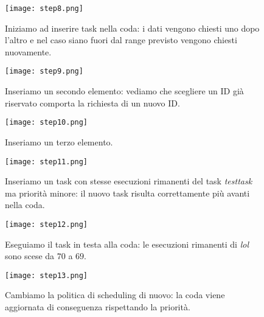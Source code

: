        	\begin{figure}[h!]
       		\begin{center}
       			\texttt{[image: step8.png]}
       		\end{center}
       		\caption{Iniziamo ad inserire task nella coda: i dati vengono chiesti uno dopo l'altro e nel caso siano fuori dal range previsto vengono chiesti nuovamente.}
       		\label{fig:step8}
       	\end{figure}
       	
       	\begin{figure}[h!]
       		\begin{center}
       			\texttt{[image: step9.png]}
       		\end{center}
       		\caption{Inseriamo un secondo elemento: vediamo che scegliere un ID già riservato comporta la richiesta di un nuovo ID.}
       		\label{fig:step9}
       	\end{figure}
       	
       	\begin{figure}[h!]
       		\begin{center}
       			\texttt{[image: step10.png]}
       		\end{center}
       		\caption{Inseriamo un terzo elemento.}
       		\label{fig:step10}
       	\end{figure}
       	
       	\begin{figure}[h!]
       		\begin{center}
       			\texttt{[image: step11.png]}
       		\end{center}
       		\caption{Inseriamo un task con stesse esecuzioni rimanenti del task \textit{testtask} ma priorità minore: il nuovo task risulta correttamente più avanti nella coda.}
       		\label{fig:step11}
       	\end{figure}
       	
       	\begin{figure}[h!]
       		\begin{center}
       			\texttt{[image: step12.png]}
       		\end{center}
       		\caption{Eseguiamo il task in testa alla coda: le esecuzioni rimanenti di \textit{lol} sono scese da $70$ a $69$.}
       		\label{fig:step12}
       	\end{figure}
       	
       	\begin{figure}[h!]
       		\begin{center}
       			\texttt{[image: step13.png]}
       		\end{center}
       		\caption{Cambiamo la politica di scheduling di nuovo: la coda viene aggiornata di conseguenza rispettando la priorità.}
       		\label{fig:step13}
       	\end{figure}
       	
